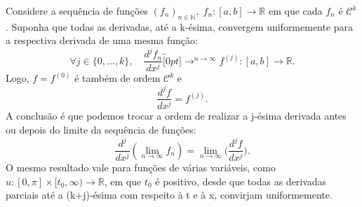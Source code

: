 \documentclass[../pde_notes.tex]{subfiles}
\begin{document}
\begin{tcolorbox}[
		skin=enhanced,
		title=Lembrete!,
		after title={\hfill Troca de j-ésima derivada com limite},
		fonttitle=\bfseries,
		sharp corners=downhill,
		colframe=black,
		colbacktitle=yellow!75!white,
		colback=yellow!30,
		colbacklower=black,
		coltitle=black,
		drop large lifted shadow
	]
	Considere a sequência de funções \((f_{n})_{n\in \mathbb{N}},\; f_{n}:[a, b]\rightarrow \mathbb{R}\) em que cada \(f_{n}\) é \(\mathcal{C}^{k}\). Suponha que todas as derivadas, até a k-ésima, convergem uniformemente para a respectiva derivada de uma mesma função:
	\[
		\forall j\in \{0,\dotsc ,k\},\quad \frac{d^{j}f_{n}}{dx^{j}}\overbracket[0pt]{\longrightarrow}^{n\to \infty}f^{(j)}:[a, b]\rightarrow \mathbb{R}.
	\]
	Logo, \(f = f^{(0)}\) é também de ordem \(\mathcal{C}^{k}\) e
	\[
		\frac{d^{j}f}{dx^{j}} = f^{(j)}.
	\]
	A conclusão é que podemos trocar a ordem de realizar a j-ésima derivada antes ou depois do limite da sequência de funções:
	\[
		\frac{d^{j}}{dx^{j}}(\lim_{n\to \infty}f_{n}) = \lim_{n\to \infty}\biggl(\frac{d^{j}f}{dx^{j}}\biggr).
	\]
	O mesmo resultado vale para funções de várias variáveis, como \(u:[0, \pi ]\times [t_{0}, \infty)\rightarrow \mathbb{R}\), em que \(t_{0}\) é positivo, desde que todas as derivadas parciais até a (k+j)-ésima com respeito à t e à x, convirjam uniformemente.
\end{tcolorbox}
\end{document}
